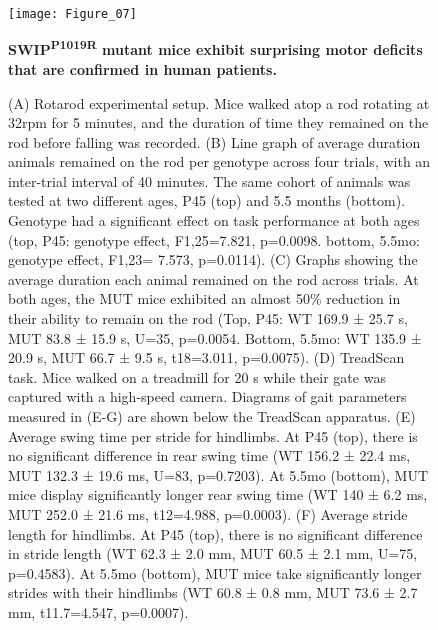 \begin{figure}[!ht]
	\begin{fullwidth}
	\begin{center}
	\captionsetup{labelformat=empty}
	\texttt{[image: Figure\_07]}
	\caption{\textbf{SWIP\textsuperscript{P1019R} mutant mice exhibit
		surprising motor deficits that are confirmed in human
		patients.}}
	\end{center}
	\end{fullwidth}
\end{figure}

\begin{figure}[!ht]
	\begin{fullwidth}
	\begin{center}
	\captionsetup{labelformat=adja-page}
	\ContinuedFloat
	\caption{
	(A) Rotarod experimental setup. Mice walked atop a rod rotating at 32rpm for 5
	minutes, and the duration of time they remained on the rod before falling was
	recorded. 
	(B) Line graph of average duration animals remained on the rod per genotype
	across four trials, with an inter-trial interval of 40 minutes. The same cohort
	of animals was tested at two different ages, P45 (top) and 5.5 months (bottom).
	Genotype had a significant effect on task performance at both ages (top, P45:
	genotype effect, F1,25=7.821, p=0.0098. bottom, 5.5mo: genotype effect, F1,23=
	7.573, p=0.0114). 
	(C) Graphs showing the average duration each animal remained on the rod across
	trials. At both ages, the MUT mice exhibited an almost 50\% reduction in their
	ability to remain on the rod (Top, P45: WT 169.9 ± 25.7 s, MUT 83.8 ± 15.9 s,
	U=35, p=0.0054. Bottom, 5.5mo: WT 135.9 ± 20.9 s, MUT 66.7 ± 9.5 s, t18=3.011,
	p=0.0075). 
	(D) TreadScan task. Mice walked on a treadmill for 20 s while their gate was
	captured with a high-speed camera. Diagrams of gait parameters measured in (E-G)
	are shown below the TreadScan apparatus. 
	(E) Average swing time per stride for hindlimbs. At P45 (top), there is no
	significant difference in rear swing time (WT 156.2 ± 22.4 ms, MUT 132.3 ± 19.6
	ms, U=83, p=0.7203). At 5.5mo (bottom), MUT mice display significantly longer
	rear swing time (WT 140 ± 6.2 ms, MUT 252.0 ± 21.6 ms, t12=4.988, p=0.0003). 
	(F) Average stride length for hindlimbs. At P45 (top), there is no significant
	difference in stride length (WT 62.3 ± 2.0 mm, MUT 60.5 ± 2.1 mm, U=75,
	p=0.4583). At 5.5mo (bottom), MUT mice take significantly longer strides with
	their hindlimbs (WT 60.8 ± 0.8 mm, MUT 73.6 ± 2.7 mm, t11.7=4.547, p=0.0007). 
}
\end{center}
\end{fullwidth}
\end{figure}
